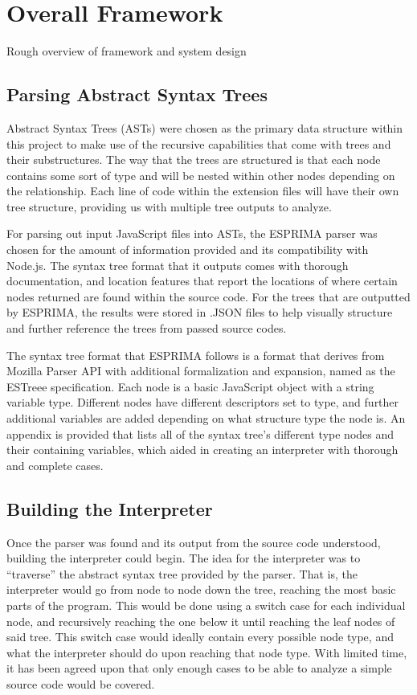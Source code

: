 \documentclass[jou,apacite]{apa6}
\begin{document}
\section{Overall Framework}

Rough overview of framework and system design

	\subsection{Parsing Abstract Syntax Trees}

		Abstract Syntax Trees (ASTs) were chosen as the primary data structure within this project to make use of the recursive capabilities that come with trees and their substructures. The way that the trees are structured is that each node contains some sort of type and will be nested within other nodes depending on the relationship. Each line of code within the extension files will have their own tree structure, providing us with multiple tree outputs to analyze.

		For parsing out input JavaScript files into ASTs, the ESPRIMA parser was chosen for the amount of information provided and its compatibility with Node.js. The syntax tree format that it outputs comes with thorough documentation, and location features that report the locations of where certain nodes returned are found within the source code. For the trees that are outputted by ESPRIMA, the results were stored in .JSON files to help visually structure and further reference the trees from passed source codes.

		The syntax tree format that ESPRIMA follows is a format that derives from Mozilla Parser API with additional formalization and expansion, named as the ESTreee specification. Each node is a basic JavaScript object with a string variable type. Different nodes have different descriptors set to type, and further additional variables are added depending on what structure type the node is. An appendix is provided that lists all of the syntax tree’s different type nodes and their containing variables, which aided in creating an interpreter with thorough and complete cases.

	\subsection{Building the Interpreter}

		Once the parser was found and its output from the source code understood, building the interpreter could begin.  The idea for the interpreter was to “traverse” the abstract syntax tree provided by the parser. That is, the interpreter would go from node to node down the tree, reaching the most basic parts of the program.  This would be done using a switch case for each individual node, and recursively reaching the one below it until reaching the leaf nodes of said tree.  This switch case would ideally contain every possible node type, and what the interpreter should do upon reaching that node type.  With limited time, it has been agreed upon that only enough cases to be able to analyze a simple source code would be covered.
\end{document}
